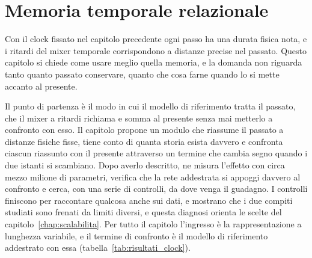 \chapter{Memoria temporale relazionale}
\label{chap:memoria_relazionale}


Con il clock fissato nel capitolo precedente ogni passo ha una durata fisica nota, e i ritardi del mixer temporale corrispondono a distanze precise nel passato. Questo capitolo si chiede come usare meglio quella memoria, e la domanda non riguarda tanto quanto passato conservare, quanto che cosa farne quando lo si mette accanto al presente.

Il punto di partenza è il modo in cui il modello di riferimento tratta il passato, che il mixer a ritardi richiama e somma al presente senza mai metterlo a confronto con esso. Il capitolo propone un modulo che riassume il passato a distanze fisiche fisse, tiene conto di quanta storia esista davvero e confronta ciascun riassunto con il presente attraverso un termine che cambia segno quando i due istanti si scambiano. Dopo averlo descritto, ne misura l'effetto con circa mezzo milione di parametri, verifica che la rete addestrata si appoggi davvero al confronto e cerca, con una serie di controlli, da dove venga il guadagno. I controlli finiscono per raccontare qualcosa anche sui dati, e mostrano che i due compiti studiati sono frenati da limiti diversi, e questa diagnosi orienta le scelte del capitolo~\ref{chap:scalabilita}. Per tutto il capitolo l'ingresso è la rappresentazione a lunghezza variabile, e il termine di confronto è il modello di riferimento addestrato con essa (tabella~\ref{tab:risultati_clock}).

